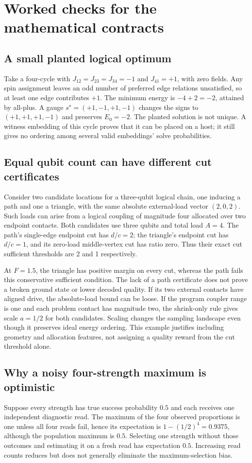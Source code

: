 \documentclass[11pt,a4paper]{article}
\theoremstyle{definition}\newtheorem{definition}[proposition]{Definition}
\begin{document}
\section{Worked checks for the mathematical contracts}\label{app:worked}
\subsection{A small planted logical optimum}
Take a four-cycle with $J_{12}=J_{23}=J_{34}=-1$ and $J_{41}=+1$, with zero fields. Any spin assignment leaves an odd number of preferred edge relations unsatisfied, so at least one edge contributes $+1$. The minimum energy is $-4+2=-2$, attained by all-plus. A gauge $s^\star=(+1,-1,+1,-1)$ changes the signs to $(+1,+1,+1,-1)$ and preserves $E_0=-2$. The planted solution is not unique. A witness embedding of this cycle proves that it can be placed on a host; it still gives no ordering among several valid embeddings' solve probabilities.

\subsection{Equal qubit count can have different cut certificates}
Consider two candidate locations for a three-qubit logical chain, one inducing a path and one a triangle, with the same absolute external-load vector $(2,0,2)$. Such loads can arise from a logical coupling of magnitude four allocated over two endpoint contacts. Both candidates use three qubits and total load $A=4$. The path's single-edge endpoint cut has $d/c=2$; the triangle's endpoint cut has $d/c=1$, and its zero-load middle-vertex cut has ratio zero. Thus their exact cut sufficient thresholds are 2 and 1 respectively.

At $F=1.5$, the triangle has positive margin on every cut, whereas the path fails this conservative sufficient condition. The lack of a path certificate does not prove a broken ground state or lower decoded quality. If its two external contacts have aligned drive, the absolute-load bound can be loose. If the program coupler range is one and each problem contact has magnitude two, the shrink-only rule gives scale $a=1/2$ for both candidates. Scaling changes the sampling landscape even though it preserves ideal energy ordering. This example justifies including geometry and allocation features, not assigning a quality reward from the cut threshold alone.

\subsection{Why a noisy four-strength maximum is optimistic}
Suppose every strength has true success probability $0.5$ and each receives one independent diagnostic read. The maximum of the four observed proportions is one unless all four reads fail, hence its expectation is $1-(1/2)^4=0.9375$, although the population maximum is $0.5$. Selecting one strength without those outcomes and estimating it on a fresh read has expectation $0.5$. Increasing read counts reduces but does not generally eliminate the maximum-selection bias.
\end{document}
